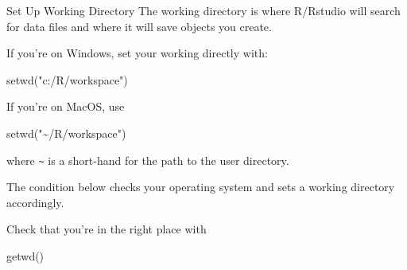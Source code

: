 \documentclass[
  11pt,
  ignorenonframetext,
  svgnames, handout, t]{beamer}
\newenvironment{Shaded}{\begin{snugshade}}{\end{snugshade}}
\newcommand{\CommentTok}[1]{\textcolor[rgb]{0.56,0.35,0.01}{\textit{#1}}}
\newcommand{\ControlFlowTok}[1]{\textcolor[rgb]{0.13,0.29,0.53}{\textbf{#1}}}
\newcommand{\FunctionTok}[1]{\textcolor[rgb]{0.00,0.00,0.00}{#1}}
\newcommand{\NormalTok}[1]{#1}
\newcommand{\SpecialCharTok}[1]{\textcolor[rgb]{0.00,0.00,0.00}{#1}}
\newcommand{\StringTok}[1]{\textcolor[rgb]{0.31,0.60,0.02}{#1}}
\begin{document}
\begin{frame}[fragile]{Set Up Working Directory}
\protect\hypertarget{set-up-working-directory}{}
The working directory is where R/Rstudio will search for data files and
where it will save objects you create.

If you're on Windows, set your working directly with:

\footnotesize

\begin{Shaded}
\begin{Highlighting}[]
    \FunctionTok{setwd}\NormalTok{(}\StringTok{"c:/R/workspace"}\NormalTok{)}
\end{Highlighting}
\end{Shaded}

\normalsize

If you're on MacOS, use

\footnotesize

\begin{Shaded}
\begin{Highlighting}[]
    \FunctionTok{setwd}\NormalTok{(}\StringTok{"\textasciitilde{}/R/workspace"}\NormalTok{)}
\end{Highlighting}
\end{Shaded}

\normalsize where \texttt{\textasciitilde{}} is a short-hand for the
path to the user directory.

The condition below checks your operating system and sets a working
directory accordingly.

\footnotesize

\begin{Shaded}
\end{Shaded}

\normalsize Check that you're in the right place with

\footnotesize

\begin{Shaded}
\begin{Highlighting}[]
    \FunctionTok{getwd}\NormalTok{()}
\end{Highlighting}
\end{Shaded}

\normalsize
\end{frame}
\end{document}
